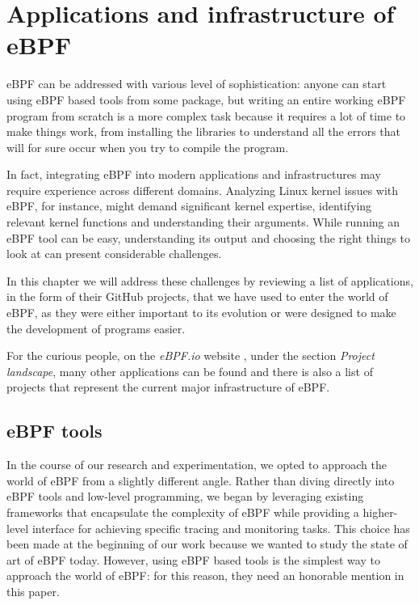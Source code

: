 \chapter{Applications and infrastructure of eBPF}

eBPF can be addressed with various level of sophistication: anyone can start using eBPF based tools from some package, but writing an entire working eBPF program from scratch is a more complex task because it requires a lot of time to make things work, from installing the libraries to understand all the errors that will for sure occur when you try to compile the program.

In fact, integrating eBPF into modern applications and infrastructures may require experience across different domains. 
Analyzing Linux kernel issues with eBPF, for instance, might demand significant kernel expertise, identifying relevant kernel functions and understanding their arguments.
While running an eBPF tool can be easy, understanding its output and choosing the right things to look at can present considerable challenges.

In this chapter we will address these challenges by reviewing a list of applications, in the form of their GitHub projects, that we have used to enter the world of eBPF, as they were either important to its evolution or were designed to make the development of programs easier.

For the curious people, on the \textit{eBPF.io} website \cite{eBPFioWebsite}, under the section \textit{Project landscape}, many other applications can be found and there is also a list of projects that represent the current major infrastructure of eBPF.

\section{eBPF tools}

In the course of our research and experimentation, we opted to approach the world of eBPF from a slightly different angle. 
Rather than diving directly into eBPF tools and low-level programming, we began by leveraging existing frameworks that encapsulate the complexity of eBPF while providing a higher-level interface for achieving specific tracing and monitoring tasks.
This choice has been made at the beginning of our work because we wanted to study the state of art of eBPF today.
However, using eBPF based tools is the simplest way to approach the world of eBPF: for this reason, they need an honorable mention in this paper.

